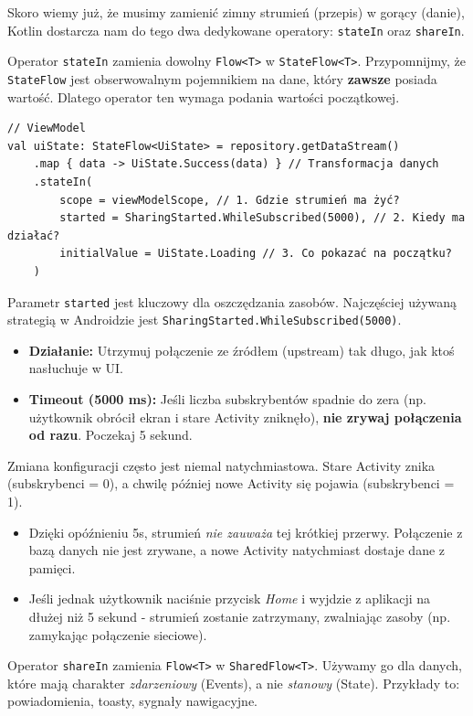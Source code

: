 Skoro wiemy już, że musimy zamienić zimny strumień (przepis) w gorący (danie), Kotlin dostarcza nam do tego dwa dedykowane operatory: \texttt{stateIn} oraz \texttt{shareIn}.

Operator \texttt{stateIn} zamienia dowolny \texttt{Flow<T>} w \texttt{StateFlow<T>}.
Przypomnijmy, że \texttt{StateFlow} jest obserwowalnym pojemnikiem na dane, który \textbf{zawsze} posiada wartość. Dlatego operator ten wymaga podania wartości początkowej.

\begin{verbatim}
// ViewModel
val uiState: StateFlow<UiState> = repository.getDataStream()
    .map { data -> UiState.Success(data) } // Transformacja danych
    .stateIn(
        scope = viewModelScope, // 1. Gdzie strumień ma żyć?
        started = SharingStarted.WhileSubscribed(5000), // 2. Kiedy ma działać?
        initialValue = UiState.Loading // 3. Co pokazać na początku?
    )
\end{verbatim}

Parametr \texttt{started} jest kluczowy dla oszczędzania zasobów. Najczęściej używaną strategią w Androidzie jest \texttt{SharingStarted.WhileSubscribed(5000)}.

\begin{itemize}
    \item \textbf{Działanie:} Utrzymuj połączenie ze źródłem (upstream) tak długo, jak ktoś nasłuchuje w UI.
    \item \textbf{Timeout (5000 ms):} Jeśli liczba subskrybentów spadnie do zera (np. użytkownik obrócił ekran i stare Activity zniknęło), \textbf{nie zrywaj połączenia od razu}. Poczekaj 5 sekund.
\end{itemize}

Zmiana konfiguracji często jest niemal natychmiastowa. Stare Activity znika (subskrybenci = 0), a chwilę później nowe Activity się pojawia (subskrybenci = 1).
\begin{itemize}
    \item Dzięki opóźnieniu 5s, strumień \textit{nie zauważa} tej krótkiej przerwy. Połączenie z bazą danych nie jest zrywane, a nowe Activity natychmiast dostaje dane z pamięci.
    \item Jeśli jednak użytkownik naciśnie przycisk \textit{Home} i wyjdzie z aplikacji na dłużej niż 5 sekund - strumień zostanie zatrzymany, zwalniając zasoby (np. zamykając połączenie sieciowe).
\end{itemize}

Operator \texttt{shareIn} zamienia \texttt{Flow<T>} w \texttt{SharedFlow<T>}.
Używamy go dla danych, które mają charakter \textit{zdarzeniowy} (Events), a nie \textit{stanowy} (State). Przykłady to: powiadomienia, toasty, sygnały nawigacyjne.

